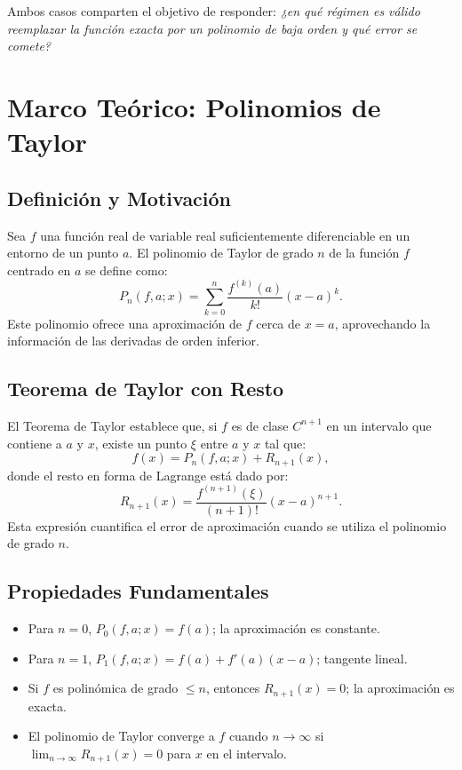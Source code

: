\documentclass{article}
\begin{document}
Ambos casos comparten el objetivo de responder: \emph{¿en qué régimen es
válido reemplazar la función exacta por un polinomio de baja orden y qué
error se comete?}

\section{Marco Teórico: Polinomios de Taylor}

\subsection{Definición y Motivación}
Sea $f$ una función real de variable real suficientemente diferenciable en un entorno de un punto $a$. El polinomio de Taylor de grado $n$ de la función $f$ centrado en $a$ se define como:
\[
P_n(f,a;x) = \sum_{k=0}^{n} \frac{f^{(k)}(a)}{k!}(x - a)^k.
\]
Este polinomio ofrece una aproximación de $f$ cerca de $x = a$, aprovechando la información de las derivadas de orden inferior.

\subsection{Teorema de Taylor con Resto}
El Teorema de Taylor establece que, si $f$ es de clase $C^{n+1}$ en un intervalo que contiene a $a$ y $x$, existe un punto $\xi$ entre $a$ y $x$ tal que:
\[
f(x) = P_n(f,a;x) + R_{n+1}(x),
\]
donde el resto en forma de Lagrange está dado por:
\[
R_{n+1}(x) = \frac{f^{(n+1)}(\xi)}{(n+1)!}(x - a)^{n+1}.
\]
Esta expresión cuantifica el error de aproximación cuando se utiliza el polinomio de grado $n$.

\subsection{Propiedades Fundamentales}
\begin{itemize}
  \item Para $n=0$, $P_0(f,a;x)=f(a)$; la aproximación es constante.
  \item Para $n=1$, $P_1(f,a;x)=f(a) + f'(a)(x-a)$; tangente lineal.
  \item Si $f$ es polinómica de grado $\le n$, entonces $R_{n+1}(x)=0$; la aproximación es exacta.
  \item El polinomio de Taylor converge a $f$ cuando $n\to\infty$ si $\lim_{n\to\infty} R_{n+1}(x) = 0$ para $x$ en el intervalo.
\end{itemize}
\end{document}

